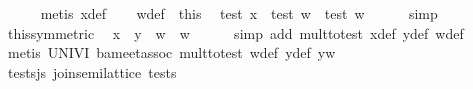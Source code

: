 \begin{isabellebody}
\ \ \ \ \isamarkupfalse%
\ {}metis\ x{}{}def{}\isanewline
\ \ \isamarkupfalse%
\ w{}{}def\ \ this\ \isamarkupfalse%
\ {}{}test\ x{}{}\ {}\ {}test\ w{}{}\ {}\ {}test\ w{}{}{}\isanewline
\ \ \ \ \isamarkupfalse%
\ simp\isanewline
\ \ \isamarkupfalse%
\ this{}symmetric{}\ \isamarkupfalse%
\ {}{}x\ {}\ y{}\ {}\ w\ {}\ w{}\isanewline
\ \ \ \ \isamarkupfalse%
\ {}simp\ add{}\ mult{}to{}test\ x{}{}def\ y{}{}def\ w{}{}def{}\isanewline
\ \ \ \ \isamarkupfalse%
\ {}metis\ UNIV{}I\ ba{}meet{}assoc\ mult{}to{}test\ w{}{}def\ y{}{}def\ yw{}\isanewline
{}\isamarkupfalse%
%
\endisatagproof
{\isafoldproof}%
%
\isadelimproof
\isanewline
%
\endisadelimproof
\isanewline
{}\isamarkupfalse%
\ tests{}js{}\ {}join{}semilattice\ tests{}\isanewline

\end{isabellebody}
